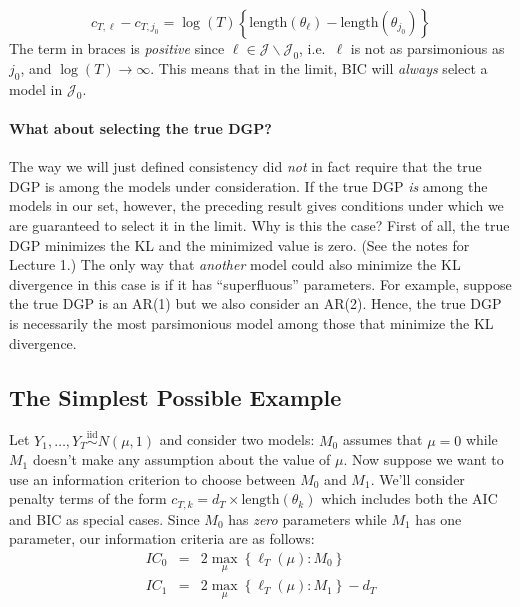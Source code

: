 \documentclass[12pt]{article}
\theoremstyle{definition}
\begin{document}
	$$c_{T,\ell} - c_{T,j_0} = \log(T) \left\{\mbox{length}(\theta_\ell) - \mbox{length}(\theta_{j_0}) \right\}$$
The term in braces is \emph{positive} since $\ell \in\mathcal{J}\backslash \mathcal{J}_0$, i.e.\ $\ell$ is not as parsimonious as $j_0$, and $\log(T) \rightarrow \infty$. This means that in the limit, BIC will \emph{always} select a model in $\mathcal{J}_0$.

\paragraph{What about selecting the true DGP?}
The way we will just defined consistency did \emph{not} in fact require that the true DGP is among the models under consideration. If the true DGP \emph{is} among the models in our set, however, the preceding result gives conditions under which we are guaranteed to select it in the limit. Why is this the case? First of all, the true DGP minimizes the KL and the minimized value is zero. (See the notes for Lecture 1.) The only way that \emph{another} model could also minimize the KL divergence in this case is if it has ``superfluous'' parameters. For example, suppose the true DGP is an AR(1) but we also consider an AR(2). Hence, the true DGP is necessarily the most parsimonious model among those that minimize the KL divergence. 
\subsection{The Simplest Possible Example}
Let $Y_1, \hdots, Y_T \overset{\mbox{iid}}{\sim} N(\mu,1)$ and consider two models: $M_0$ assumes that $\mu = 0$ while $M_1$ doesn't make any assumption about the value of $\mu$. Now suppose we want to use an information criterion to choose between $M_0$ and $M_1$. We'll consider penalty terms of the form $c_{T,k} = d_T 
\times \mbox{length}(\theta_k)$ which includes both the AIC and BIC as special cases. Since $M_0$ has \emph{zero} parameters while $M_1$ has one parameter, our information criteria are as follows:
	\begin{eqnarray*}
		IC_0 &=& 2 \max_\mu \left\{\ell_T(\mu)\colon M_0 \right\} \\
		IC_1 &=& 2 \max_\mu \left\{\ell_T(\mu)\colon M_1 \right\} - d_T
	\end{eqnarray*}
\end{document}
